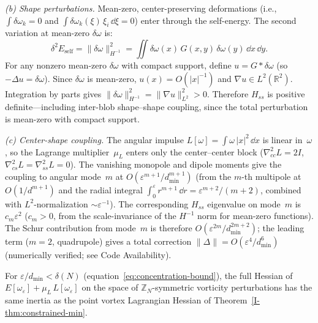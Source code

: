 \emph{(b) Shape perturbations.}  Mean-zero, center-preserving
deformations (i.e., $\int\delta\omega_k = 0$ and
$\int\delta\omega_k(\xi)\,\xi_i\,\dd\xi = 0$)
enter through the self-energy.  The second variation at
mean-zero $\delta\omega$ is:
\begin{equation}\label{eq:self-energy-Hminus1}
  \delta^2 E_{\mathrm{self}}
  = \|\delta\omega\|_{H^{-1}}^2
  = \iint \delta\omega(x)\,G(x,y)\,\delta\omega(y)\,\dd x\,\dd y.
\end{equation}
For any nonzero mean-zero $\delta\omega$ with compact support,
define $u = G * \delta\omega$ (so $-\Delta u = \delta\omega$).
Since $\delta\omega$ is mean-zero, $u(x) = O(|x|^{-1})$ and
$\nabla u \in L^2(\mathbb{R}^2)$.  Integration by parts gives
$\|\delta\omega\|_{H^{-1}}^2 = \|\nabla u\|_{L^2}^2 > 0$.
Therefore $H_{ss}$ is positive definite---including inter-blob
shape--shape coupling, since the total perturbation is
mean-zero with compact support.

\emph{(c) Center-shape coupling.}  The angular impulse
$L[\omega] = \int\omega\,|x|^2\,\dd x$ is linear in~$\omega$,
so the Lagrange multiplier~$\mu_L$ enters only the
center--center block ($\nabla^2_{cc}L = 2I$,
$\nabla^2_{cs}L = \nabla^2_{ss}L = 0$).
The vanishing monopole and dipole moments give the coupling
to angular mode~$m$ at
$O(\varepsilon^{m+1}/d_{\min}^{m+1})$ (from the $m$-th multipole
at $O(1/d^{m+1})$ and the radial integral
$\int_0^\varepsilon r^{m+1}\,\dd r = \varepsilon^{m+2}/(m{+}2)$,
combined with $L^2$-normalization $\sim\varepsilon^{-1}$).
The corresponding $H_{ss}$ eigenvalue on mode~$m$ is
$c_m\varepsilon^2$ ($c_m > 0$, from the scale-invariance of
the $H^{-1}$ norm for mean-zero functions).
The Schur contribution from mode~$m$ is therefore
$O(\varepsilon^{2m}/d_{\min}^{2m+2})$;
the leading term ($m = 2$, quadrupole) gives a total correction
$\|\Delta\| = O(\varepsilon^4/d_{\min}^6)$
(numerically verified; see Code Availability).

\begin{proposition}
\label{prop:inertia}
For $\varepsilon/d_{\min} < \delta(N)$
(equation~\eqref{eq:concentration-bound}),
the full Hessian of
$E[\omega_\varepsilon] + \mu_L\,L[\omega_\varepsilon]$ on the space of
$\mathbb{Z}_N$-symmetric vorticity perturbations has the same inertia
as the point vortex Lagrangian Hessian of
Theorem~\ref*{I-thm:constrained-min}.
\end{proposition}

